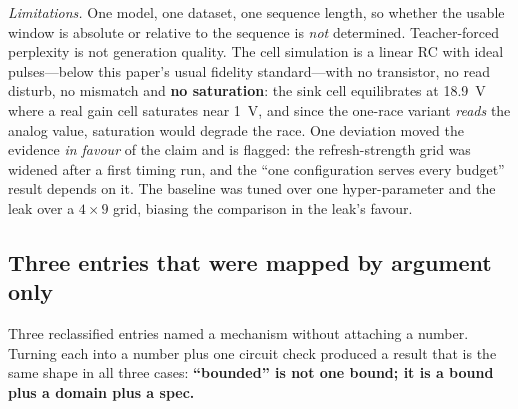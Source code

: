 \documentclass[11pt]{article}
\begin{document}
\textit{Limitations.} One model, one dataset, one sequence length, so whether the usable window is absolute or relative to the sequence is \textit{not} determined. Teacher-forced perplexity is not generation quality. The cell simulation is a linear RC with ideal pulses---below this paper's usual fidelity standard---with no transistor, no read disturb, no mismatch and \textbf{no saturation}: the sink cell equilibrates at 18.9~V where a real gain cell saturates near 1~V, and since the one-race variant \textit{reads} the analog value, saturation would degrade the race. One deviation moved the evidence \textit{in favour} of the claim and is flagged: the refresh-strength grid was widened after a first timing run, and the ``one configuration serves every budget'' result depends on it. The baseline was tuned over one hyper-parameter and the leak over a $4\times9$ grid, biasing the comparison in the leak's favour.

\subsection{Three entries that were mapped by argument only}
\label{sec:argentries}

Three reclassified entries named a mechanism without attaching a number. Turning each into a number plus one circuit check produced a result that is the same shape in all three cases: \textbf{``bounded'' is not one bound; it is a bound plus a domain plus a spec.}
\end{document}
